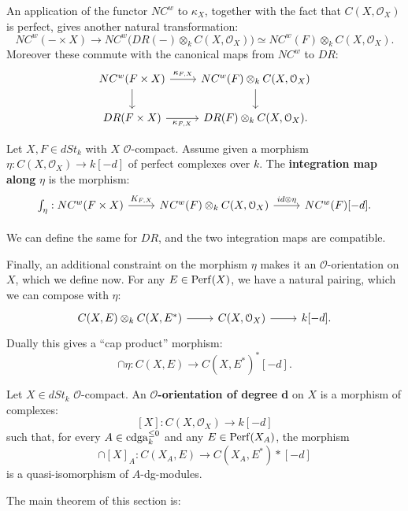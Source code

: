 An application of the functor $NC^w$ to $\kappa_X$, together with the fact that $C(X,\mathcal{O}_X)$ is perfect,
gives another natural transformation:
\[	NC^w(- \times X) \to NC^w\big(DR(-) \otimes_k C(X,\mathcal{O}_X)\big) \simeq NC^w(F) \otimes_k C(X,\mathcal{O}_X) .	\]
Moreover these commute with the canonical maps from $NC^w$ to $DR$:
\[
\begin{tikzcd}
NC^w( F \times X) \arrow{r}{\kappa_{F,X}}\arrow{d} & NC^w(F) \otimes_k C(X,\mathcal{O}_X)\arrow{d} \\
DR( F \times X) \arrow[swap]{r}{\kappa_{F,X}} & DR(F) \otimes_k C(X,\mathcal{O}_X) .
\end{tikzcd}
\]

\begin{defin}
Let $X,F \in dSt_k$ with $X$ $\mathcal{O}$-compact. Assume given a morphism $\eta : C(X,\mathcal{O}_X) \to k[-d]$ of
perfect complexes over $k$. The \textbf{integration map along} $\eta$ is the morphism:
\[
\begin{tikzcd}
\int_{\eta} : NC^w(F\times X) \arrow{r}{K_{F,X}} & NC^w(F) \otimes_k C(X,\mathcal{O}_X) \arrow{r}{id \otimes \eta} &
NC^w(F)[-d] .
\end{tikzcd}
\]
\end{defin}
\begin{rem}
We can define the same for $DR$, and the two integration maps are compatible.
\end{rem}

Finally, an additional constraint on the morphism $\eta$ makes it an $\mathcal{O}$-orientation on $X$, which we define now.
For any $E \in \mathrm{Perf}(X)$, we have a natural pairing, which we can compose with $\eta$:
\[
\begin{tikzcd}
C(X,E) \otimes_k C(X,E^*) \arrow{r} & C(X,\mathcal{O}_X)\arrow{r} & k[-d] .
\end{tikzcd}
\]
Dually this gives a ``cap product'' morphism:
\[	\cap \eta : C(X,E) \to C(X,E^*)^*[-d].	\]

\begin{defin}
Let $X \in dSt_k$ $\mathcal{O}$-compact. An $\mathcal{O}$\textbf{-orientation of degree d} on $X$ is a morphism of complexes:
\[	[X] : C(X,\mathcal{O}_X) \to k[-d]	\]
such that, for every $A \in \operatorname{cdga}_k^{\leq 0}$ and any $E \in \mathrm{Perf}(X_A)$, the morphism
\[	\cap [X]_A : C(X_A,E) \to C(X_A,E^*)*[-d]	\]
is a quasi-isomorphism of $A$-dg-modules.
\end{defin}

The main theorem of this section is:

